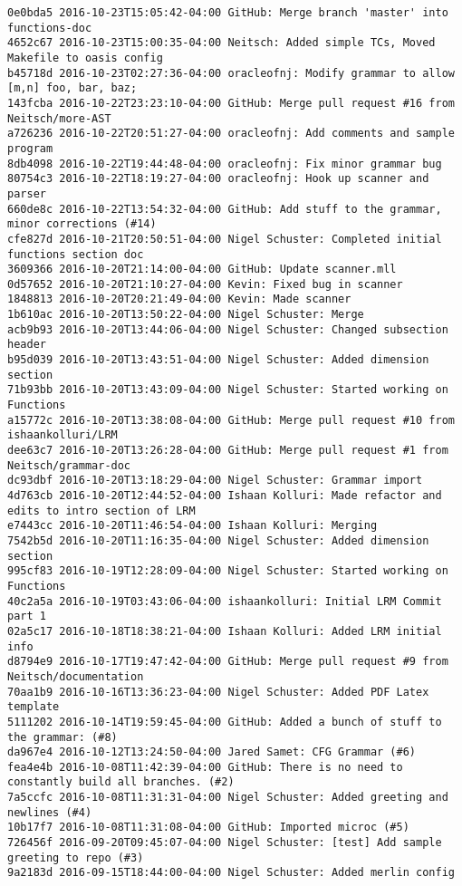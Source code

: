 \begin{lstlisting}
0e0bda5 2016-10-23T15:05:42-04:00 GitHub: Merge branch 'master' into functions-doc
4652c67 2016-10-23T15:00:35-04:00 Neitsch: Added simple TCs, Moved Makefile to oasis config
b45718d 2016-10-23T02:27:36-04:00 oracleofnj: Modify grammar to allow [m,n] foo, bar, baz;
143fcba 2016-10-22T23:23:10-04:00 GitHub: Merge pull request #16 from Neitsch/more-AST
a726236 2016-10-22T20:51:27-04:00 oracleofnj: Add comments and sample program
8db4098 2016-10-22T19:44:48-04:00 oracleofnj: Fix minor grammar bug
80754c3 2016-10-22T18:19:27-04:00 oracleofnj: Hook up scanner and parser
660de8c 2016-10-22T13:54:32-04:00 GitHub: Add stuff to the grammar, minor corrections (#14)
cfe827d 2016-10-21T20:50:51-04:00 Nigel Schuster: Completed initial functions section doc
3609366 2016-10-20T21:14:00-04:00 GitHub: Update scanner.mll
0d57652 2016-10-20T21:10:27-04:00 Kevin: Fixed bug in scanner
1848813 2016-10-20T20:21:49-04:00 Kevin: Made scanner
1b610ac 2016-10-20T13:50:22-04:00 Nigel Schuster: Merge
acb9b93 2016-10-20T13:44:06-04:00 Nigel Schuster: Changed subsection header
b95d039 2016-10-20T13:43:51-04:00 Nigel Schuster: Added dimension section
71b93bb 2016-10-20T13:43:09-04:00 Nigel Schuster: Started working on Functions
a15772c 2016-10-20T13:38:08-04:00 GitHub: Merge pull request #10 from ishaankolluri/LRM
dee63c7 2016-10-20T13:26:28-04:00 GitHub: Merge pull request #1 from Neitsch/grammar-doc
dc93dbf 2016-10-20T13:18:29-04:00 Nigel Schuster: Grammar import
4d763cb 2016-10-20T12:44:52-04:00 Ishaan Kolluri: Made refactor and edits to intro section of LRM
e7443cc 2016-10-20T11:46:54-04:00 Ishaan Kolluri: Merging
7542b5d 2016-10-20T11:16:35-04:00 Nigel Schuster: Added dimension section
995cf83 2016-10-19T12:28:09-04:00 Nigel Schuster: Started working on Functions
40c2a5a 2016-10-19T03:43:06-04:00 ishaankolluri: Initial LRM Commit part 1
02a5c17 2016-10-18T18:38:21-04:00 Ishaan Kolluri: Added LRM initial info
d8794e9 2016-10-17T19:47:42-04:00 GitHub: Merge pull request #9 from Neitsch/documentation
70aa1b9 2016-10-16T13:36:23-04:00 Nigel Schuster: Added PDF Latex template
5111202 2016-10-14T19:59:45-04:00 GitHub: Added a bunch of stuff to the grammar: (#8)
da967e4 2016-10-12T13:24:50-04:00 Jared Samet: CFG Grammar (#6)
fea4e4b 2016-10-08T11:42:39-04:00 GitHub: There is no need to constantly build all branches. (#2)
7a5ccfc 2016-10-08T11:31:31-04:00 Nigel Schuster: Added greeting and newlines (#4)
10b17f7 2016-10-08T11:31:08-04:00 GitHub: Imported microc (#5)
726456f 2016-09-20T09:45:07-04:00 Nigel Schuster: [test] Add sample greeting to repo (#3)
9a2183d 2016-09-15T18:44:00-04:00 Nigel Schuster: Added merlin config

\end{lstlisting}
